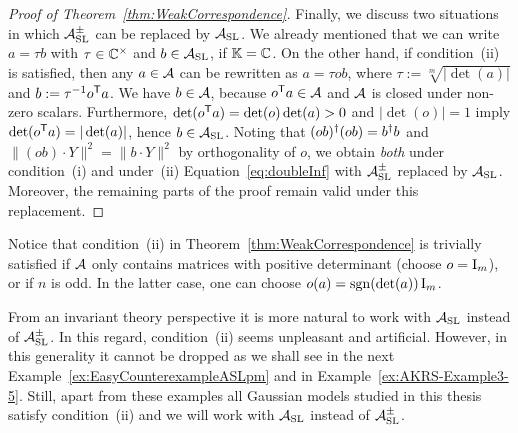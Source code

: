 \begin{proof}[Proof of Theorem~\ref{thm:WeakCorrespondence}]
	Finally, we discuss two situations in which $\mathcal{A}_{\operatorname{SL}}^{\pm}$ can be replaced by $\mathcal{A}_{\operatorname{SL}}$. We already mentioned that we can write $a = \tau b$ with $\tau \in \mathbb C^{\times}$ and $b \in \mathcal{A}_{\operatorname{SL}}$, if $\mathbb K = \mathbb C$.
	On the other hand, if condition~(ii) is satisfied, then any $a \in \mathcal{A}$ can be rewritten as $a = \tau o b$, where $\tau := \sqrt[m]{|\det(a)|}$ and $b := \tau^{-1} o^{\mathsf{T}} a$. We have $b \in \mathcal{A}$, because $o^{\mathsf{T}} a \in \mathcal{A}$ and $\mathcal{A}$ is closed under non-zero scalars. Furthermore, $\det(o^{\mathsf{T}} a)  = \det(o)\det(a) > 0$ and $|\det(o)| = 1$ imply $\det(o^{\mathsf{T}} a) = |\det(a)|$, hence $b \in \mathcal{A}_{\operatorname{SL}}$. Noting that $(ob)^{\dagger} (ob) = b^{\dagger} b$ and $\|(ob) \cdot Y\|^2 = \|b \cdot Y\|^2$ by orthogonality of $o$, we obtain \emph{both} under condition~(i) and under~(ii) Equation~\eqref{eq:doubleInf} with $\mathcal{A}_{\operatorname{SL}}^{\pm}$ replaced by $\mathcal{A}_{\operatorname{SL}}$. Moreover, the remaining parts of the proof remain valid under this replacement.
\end{proof}

\begin{remark}\label{rem:ConditionIIweakCorrespondence}
	Notice that condition~(ii) in Theorem~\ref{thm:WeakCorrespondence} is trivially satisfied if $\mathcal{A}$ only contains matrices with positive determinant (choose $o = \operatorname{I}_m$), or if $n$ is odd. In the latter case, one can choose $o(a) = \mathrm{sgn}(\det(a)) \operatorname{I}_m$.
	
	From an invariant theory perspective it is more natural to work with $\mathcal{A}_{\operatorname{SL}}$ instead of $\mathcal{A}_{\operatorname{SL}}^{\pm}$. In this regard, condition~(ii) seems unpleasant and artificial. However, in this generality it cannot be dropped as we shall see in the next Example~\ref{ex:EasyCounterexampleASLpm} and in Example~\ref{ex:AKRS-Example3-5}.
	Still, apart from these examples all Gaussian models studied in this thesis satisfy condition~(ii) and we will work with $\mathcal{A}_{\operatorname{SL}}$ instead of $\mathcal{A}_{\operatorname{SL}}^{\pm}$.
	\hfill\remSymbol
\end{remark}

